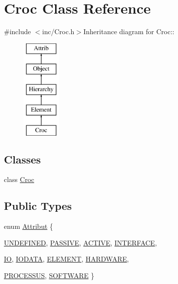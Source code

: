 \hypertarget{classCroc}{
\section{Croc Class Reference}
\label{classCroc}
}


{\ttfamily \#include $<$inc/Croc.h$>$}Inheritance diagram for Croc::\begin{figure}[H]
\begin{center}
\leavevmode
\includegraphics[height=5cm]{classCroc}
\end{center}
\end{figure}
\subsection*{Classes}
\begin{DoxyCompactItemize}
\item 
class \hyperlink{classCroc_1_1Croc}{Croc}
\end{DoxyCompactItemize}
\subsection*{Public Types}
\begin{DoxyCompactItemize}
\item 
enum \hyperlink{classAttrib_a69e171d7cc6417835a5a306d3c764235}{Attribut} \{ \par
\hyperlink{classAttrib_a69e171d7cc6417835a5a306d3c764235a3a8da2ab97dda18aebab196fe4100531}{UNDEFINED}, 
\hyperlink{classAttrib_a69e171d7cc6417835a5a306d3c764235a2bfb2af57b87031d190a05fe25dd92ed}{PASSIVE}, 
\hyperlink{classAttrib_a69e171d7cc6417835a5a306d3c764235a3b1fec929c0370d1436f2f06e298fb0d}{ACTIVE}, 
\hyperlink{classAttrib_a69e171d7cc6417835a5a306d3c764235aa27c16b480a369ea4d18b07b2516bbc7}{INTERFACE}, 
\par
\hyperlink{classAttrib_a69e171d7cc6417835a5a306d3c764235a1420a5b8c0540b2af210b6975eded7f9}{IO}, 
\hyperlink{classAttrib_a69e171d7cc6417835a5a306d3c764235a0af3b0d0ac323c1704e6c69cf90add28}{IODATA}, 
\hyperlink{classAttrib_a69e171d7cc6417835a5a306d3c764235a7788bc5dd333fd8ce18562b269c9dab1}{ELEMENT}, 
\hyperlink{classAttrib_a69e171d7cc6417835a5a306d3c764235a61ceb22149f365f1780d18f9d1459423}{HARDWARE}, 
\par
\hyperlink{classAttrib_a69e171d7cc6417835a5a306d3c764235a75250e29692496e73effca2c0330977f}{PROCESSUS}, 
\hyperlink{classAttrib_a69e171d7cc6417835a5a306d3c764235a103a67cd0b8f07ef478fa45d4356e27b}{SOFTWARE}
 \}
\end{DoxyCompactItemize}

